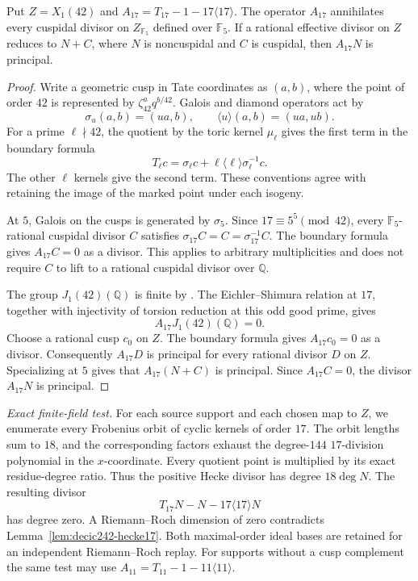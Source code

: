 \begin{lemma}\label{lem:decic242-hecke17}
Put $Z=X_1(42)$ and
$A_{17}=T_{17}-1-17\langle17\rangle$.
The operator $A_{17}$ annihilates every cuspidal divisor on
$Z_{\mathbb F_5}$ defined over $\mathbb F_5$.
If a rational effective divisor on $Z$ reduces to $N+C$, where
$N$ is noncuspidal and $C$ is cuspidal, then $A_{17}N$ is
principal.
\end{lemma}
\begin{proof}
Write a geometric cusp in Tate coordinates as $(a,b)$, where
the point of order $42$ is represented by
$\zeta_{42}^a q^{b/42}$.
Galois and diamond operators act by
\[
 \sigma_u(a,b)=(ua,b),\qquad
 \langle u\rangle(a,b)=(ua,ub).
\]
For a prime $\ell\nmid42$, the quotient by the toric kernel
$\mu_\ell$ gives the first term in the boundary formula
\[
 T_\ell c=\sigma_\ell c+
 \ell\langle\ell\rangle\sigma_\ell^{-1}c.
\]
The other $\ell$ kernels give the second term.
These conventions agree with retaining the image of the marked
point under each isogeny.

At $5$, Galois on the cusps is generated by $\sigma_5$.
Since $17\equiv5^5\pmod{42}$, every $\mathbb F_5$-rational
cuspidal divisor $C$ satisfies
$\sigma_{17}C=C=\sigma_{17}^{-1}C$.
The boundary formula gives $A_{17}C=0$ as a divisor.
This applies to arbitrary multiplicities and does not require
$C$ to lift to a rational cuspidal divisor over $\mathbb Q$.

The group $J_1(42)(\mathbb Q)$ is finite by
\cite[Theorems~3.1 and~4.13, Table~2]{DEHMZ}.
The Eichler--Shimura relation at $17$, together with injectivity
of torsion reduction at this odd good prime, gives
\[
 A_{17}J_1(42)(\mathbb Q)=0.
\]
Choose a rational cusp $c_0$ on $Z$. The boundary formula gives
$A_{17}c_0=0$ as a divisor.
Consequently $A_{17}D$ is principal for every rational divisor
$D$ on $Z$.
Specializing at $5$ gives that $A_{17}(N+C)$ is principal.
Since $A_{17}C=0$, the divisor $A_{17}N$ is principal.
\end{proof}

\noindent\emph{Exact finite-field test.}
For each source support and each chosen map to $Z$, we enumerate
every Frobenius orbit of cyclic kernels of order $17$.
The orbit lengths sum to $18$, and the corresponding factors
exhaust the degree-$144$ $17$-division polynomial in the
$x$-coordinate. Every quotient point is multiplied by its exact
residue-degree ratio. Thus the positive Hecke divisor has degree
$18\deg N$.
The resulting divisor
\[
 T_{17}N-N-17\langle17\rangle N
\]
has degree zero. A Riemann--Roch dimension of zero contradicts
Lemma~\ref{lem:decic242-hecke17}.
Both maximal-order ideal bases are retained for an independent
Riemann--Roch replay.
For supports without a cusp complement the same test may use
$A_{11}=T_{11}-1-11\langle11\rangle$.
